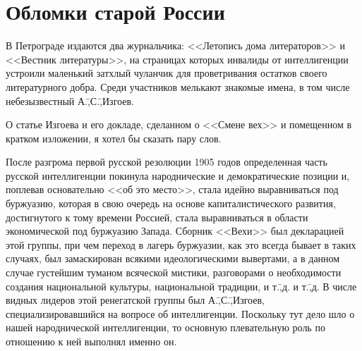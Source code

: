 \section*{Обломки старой России}
\label{sec:4}

В Петрограде издаются два журнальчика: <<Летопись дома литераторов>> и <<Вестник литературы>>, на страницах которых инвалиды от интеллигенции устроили маленький затхлый чуланчик для проветривания остатков своего литературного добра. Среди участников мелькают знакомые имена, в том числе небезызвестный А.\=,С.\=,Изгоев.

О статье Изгоева и его докладе, сделанном о <<Смене вех>> и помещенном в кратком изложении, я хотел бы сказать пару слов.

После разгрома первой русской резолюции 1905 годов определенная часть русской интеллигенции покинула народнические и демократические позиции и, поплевав основательно <<об это место>>, стала идейно выравниваться под буржуазию, которая в свою очередь на основе капиталистического развития, достигнутого к тому времени Россией, стала выравниваться в области экономической под буржуазию Запада. Сборник <<Вехи>> был декларацией этой группы, при чем переход в лагерь буржуазии, как это всегда бывает в таких случаях, был замаскирован всякими идеологическими вывертами, а в данном случае густейшим туманом всяческой мистики, разговорами о необходимости создания национальной культуры, национальной традиции, и т.\=,д. и т.\=,д. В числе видных лидеров этой ренегатской группы был А.\=,С.\=,Изгоев, специализировавшийся на вопросе об интеллигенции. Поскольку тут дело шло о нашей народнической интеллигенции, то основную плевательную роль по отношению к ней выполнял именно он.

